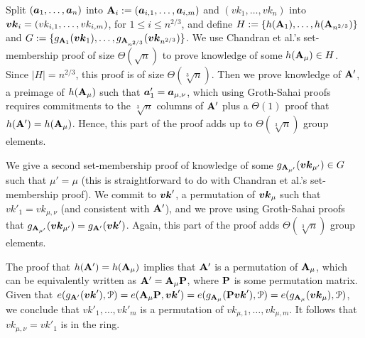 Split $({\boldsymbol{a}}_{1},\ldots, {\boldsymbol{a}}_{n})$ into $\mathbf{{A}}_i := ({\boldsymbol{a}}_{i,1},\ldots,{\boldsymbol{a}}_{i,m})$ and $(vk_1,\ldots,vk_n)$ into ${\boldsymbol{vk}}_i = (vk_{i,1},\ldots,vk_{i,m})$,  for $1\leq i\leq n^{2/3}$, and define $H\allowbreak:=\{h(\mathbf{{A}}_1),\allowbreak\ldots,\allowbreak h(\mathbf{{A}}_{n^{2/3}})\}$ and $G := \{g_{\mathbf{{A}}_1}({\boldsymbol{vk}}_1),\ldots,g_{\mathbf{{A}}_{n^{2/3}}}({\boldsymbol{vk}}_{n^{2/3}})\}$.  
We use Chandran et al.'s set-membership proof of size $\Theta(\sqrt{n})$ to prove knowledge of some $h(\mathbf{{A}}_\mu)\in H$. Since $|H|=n^{2/3}$, this proof is of size $\Theta(\sqrt[3]{n})$. Then we prove knowledge of $\mathbf{{A}}'$, a preimage of $h(\mathbf{{A}}_\mu)$ such that ${\boldsymbol{a}}'_1 = {\boldsymbol{a}}_{\mu,\nu}$, which using Groth-Sahai proofs requires commitments to the $\sqrt[3]{n}$ columns of $\mathbf{{A}}'$ plus a $\Theta(1)$ proof that $h(\mathbf{{A}}')=h(\mathbf{{A}}_\mu)$. Hence, this part of the proof adds up to $\Theta(\sqrt[3]{n})$ group elements.

We give a second set-membership proof of knowledge of some
$g_{\mathbf{{A}}_{\mu'}}({\boldsymbol{vk}}_{\mu'})\in G$ such that $\mu'=\mu$ (this is straightforward to do with Chandran et al.'s set-membership proof).
We commit to ${\boldsymbol{vk}}'$, a permutation of ${\boldsymbol{vk}}_\mu$ such that $vk'_1=vk_{\mu,\nu}$ (and consistent with $\mathbf{{A}}'$), and we prove using Groth-Sahai proofs that $g_{\mathbf{{A}}_{\mu'}}({\boldsymbol{vk}}_{\mu'}) = g_{\mathbf{{A}}'}({\boldsymbol{vk}}')$. Again, this part of the proof adds $\Theta(\sqrt[3]{n})$ group elements.

The proof that $h(\mathbf{{A}}')=h(\mathbf{{A}}_\mu)$ implies that $\mathbf{{A}}'$ is a permutation of $\mathbf{{A}}_\mu$, which can be equivalently written as $\mathbf{{A}}' = \mathbf{{A}}_\mu\mathbf{{P}}$, where $\mathbf{{P}}$ is some permutation matrix. Given that  $e(g_{\mathbf{{A}}'}({\boldsymbol{vk}}'),\mathcal{P})  = e(\mathbf{{A}}_\mu\mathbf{{P}},{\boldsymbol{vk}}')= e(g_{\mathbf{{A}}_\mu}(\mathbf{{P}}{\boldsymbol{vk}}'),\mathcal{P}) = e(g_{\mathbf{{A}}_{\mu}}({\boldsymbol{vk}}_\mu),\mathcal{P})$, we conclude that $vk'_1,\ldots,vk'_m$ is a permutation of $vk_{\mu,1},\ldots,vk_{\mu,m}$. It follows that $vk_{\mu,\nu}=vk'_1$ is in the ring.

